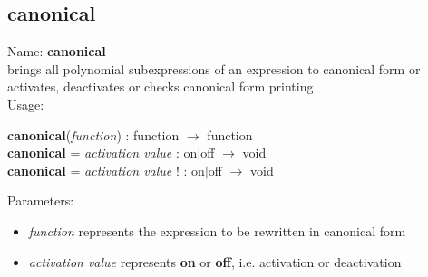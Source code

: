 \subsection{canonical}
\label{labcanonical}
\noindent Name: \textbf{canonical}\\
brings all polynomial subexpressions of an expression to canonical form or activates, deactivates or checks canonical form printing\\
\noindent Usage: 
\begin{center}
\textbf{canonical}(\emph{function}) : \textsf{function} $\rightarrow$ \textsf{function}\\
\textbf{canonical} = \emph{activation value} : \textsf{on$|$off} $\rightarrow$ \textsf{void}\\
\textbf{canonical} = \emph{activation value} ! : \textsf{on$|$off} $\rightarrow$ \textsf{void}\\
\end{center}
Parameters: 
\begin{itemize}
\item \emph{function} represents the expression to be rewritten in canonical form
\item \emph{activation value} represents \textbf{on} or \textbf{off}, i.e. activation or deactivation
\end{itemize}
